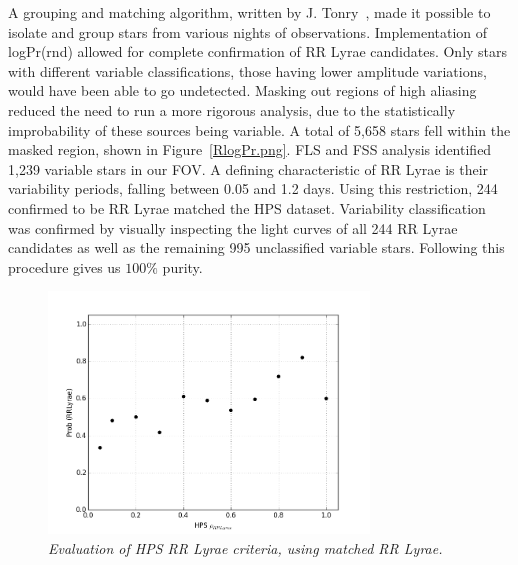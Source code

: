 \documentclass[aps,prb,twocolumn,superscriptaddress]{revtex4-1}
\begin{document}


A grouping and matching algorithm, written by J. Tonry~\cite{gri}, made it possible to isolate and group 
stars from various nights of observations.  
Implementation of logPr(rnd) allowed for complete confirmation of RR Lyrae candidates.  Only stars with different 
variable classifications, those having lower amplitude variations, would have been able to go
undetected.  Masking out regions of high aliasing reduced the need to run a more rigorous analysis, %
due to the statistically improbability of these sources being variable.  A total of 5,658 stars fell within 
the masked region, shown in Figure~\ref{RlogPr.png}.  FLS and FSS analysis identified 1,239 variable stars in our FOV.  
A defining characteristic of RR Lyrae is their variability periods, falling between 0.05 and 1.2 days.  Using this 
restriction, 244 confirmed to be RR Lyrae matched the HPS dataset.  Variability classification was confirmed by visually inspecting 
the light curves of all 244 RR Lyrae candidates as well as the remaining 995 unclassified variable stars.  Following this procedure gives us 
$100\%$ purity.

\begin{figure}[H]
 \centering
 	\includegraphics[width=3.35in]{figures/NEW/probrr_vs_HPS.png}
 \caption{\it \small{Evaluation of HPS RR Lyrae criteria, using matched RR Lyrae.}}
 \label{fig:probrrHPS}
\end{figure}
\end{document}
